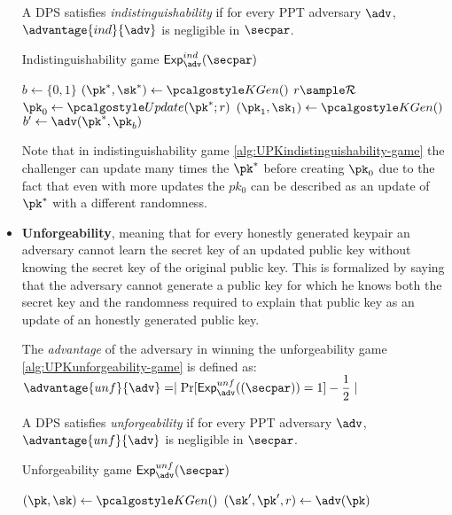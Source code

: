 \begin{itemize}
\begin{definition}
        A DPS satisfies \emph{indistinguishability} if for every PPT adversary $\adv$, $\advantage{ind}{\adv}$ is negligible in  $\secpar$.
    \end{definition}
    \begin{game}[htbp]
        \DontPrintSemicolon
        \SetAlgoLined
        \caption{Indistinguishability game $\exper^{ind}_{\adv}(\secpar)$}
        \label{alg:UPKindistinguishability-game}
        \Input{$\secpar$}
        \BlankLine
        $b\gets \{0, 1\}$ \;
        $(\pk^*, \sk^*) \gets \kgen()$\;
        $r \sample \randspace$\;
        $\pk_0 \gets \upd(\pk^*;r)$\;
        $(\pk_1, \sk_1) \gets \kgen()$\;
        $b^\prime \gets \adv(\pk^*, \pk_b)$\;
    \end{game}
    Note that in indistinguishability game \ref{alg:UPKindistinguishability-game} the challenger can update many times the $\pk^*$ before creating $\pk_0$ due to the fact that even with more updates the $pk_0$ can be described as an update of $\pk^*$ with a different randomness.
    \item \textbf{Unforgeability}, meaning that for every honestly generated keypair an adversary cannot learn the secret key of an updated public key without knowing the secret key of the original public key. This is formalized by saying that the adversary cannot generate a public key for which he knows both the secret key and the randomness required to explain that public key as an update of an honestly generated public key.
    \begin{definition}\label{def:UPKunforgeability} 
        The \emph{advantage} of the adversary in winning the unforgeability game \ref{alg:UPKunforgeability-game} is defined as:
        $
            \advantage{unf}{\adv} = \mid \Pr[\exper^{unf}_{\adv}((\secpar))=1] - \dfrac{1}{2} \mid
        $
    
        A DPS satisfies \emph{unforgeability} if for every PPT adversary $\adv$, $\advantage{unf}{\adv}$ is negligible in  $\secpar$.
    \end{definition}
    \begin{game}[htbp]
        \DontPrintSemicolon
        \SetAlgoLined
        \caption{Unforgeability game $\exper^{unf}_{\adv}(\secpar)$}
        \label{alg:UPKunforgeability-game}
        \Input{$\secpar$}
        \BlankLine
        $(\pk, \sk) \gets \kgen()$\;
        $(\sk^\prime, \pk^\prime, r) \gets \adv(\pk)$\;
    \end{game}
\end{itemize}

